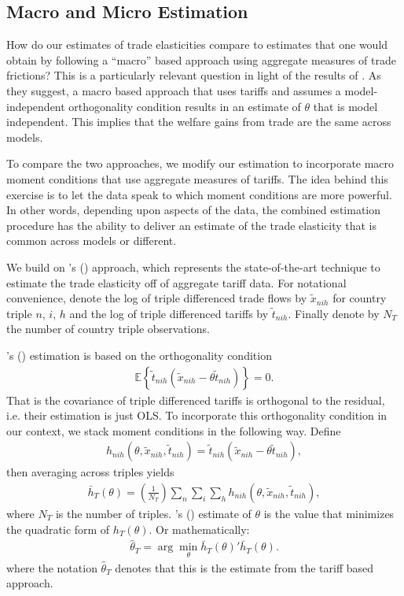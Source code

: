 \documentclass[12pt,dvips, ps2pdf]{article}
\def\citeapos#1{\citeauthor{#1}'s (\citeyear{#1})}
\begin{document}
\subsection{Macro and Micro Estimation}\label{sec:macro_micro}

How do our estimates of trade elasticities compare to estimates that one would obtain by following a ``macro'' based approach using aggregate measures of trade frictions? This is a particularly relevant question in light of the results of \citet{acr09}. As they suggest, a macro based approach that uses tariffs and assumes a model-independent orthogonality condition results in an estimate of $\theta$ that is model independent. This implies that the welfare gains from trade are the same across models.

To compare the two approaches, we modify our estimation to incorporate macro moment conditions that use aggregate measures of tariffs. The idea behind this exercise is to let the data speak to which moment conditions are more powerful. In other words, depending upon aspects of the data, the combined estimation procedure has the ability to deliver an estimate of the trade elasticity that is common across models or different.

We build on \citeapos{caliendo2010} approach, which represents the state-of-the-art technique to estimate the trade elasticity off of aggregate tariff data. For notational convenience, denote the log of triple differenced trade flows by $\tilde x_{nih}$ for country triple $n$, $i$, $h$ and the log of triple differenced tariffs by $\tilde t_{nih}$. Finally denote by $N_T$ the number of country triple observations.

\citeapos{caliendo2010} estimation is based on the orthogonality condition
\begin{align}
\mathbb{E}\left\{ \tilde t_{nih} \left(\tilde x_{nih} - \theta \tilde t_{nih}\right) \right\} = 0.
\end{align}
That is the covariance of triple differenced tariffs is orthogonal to the residual, i.e. their estimation is just OLS. To incorporate this orthogonality condition in our context, we stack moment conditions in the following way. Define
\begin{align}
h_{nih}(\theta,\tilde x_{nih},\tilde t_{nih}) = \tilde t_{nih} \left(\tilde x_{nih} - \theta \tilde t_{nih}\right),
\end{align}
then averaging across triples yields
\begin{align}
\bar{h}_T(\theta) = \left(\frac{1}{N_T}\right)\sum_{n}\sum_{i}\sum_{h}h_{nih}(\theta,\tilde x_{nih},\tilde t_{nih}),
\end{align}
where $N_T$ is the number of triples. \citeapos{caliendo2010} estimate of $\theta$ is the value that minimizes the quadratic form of $h_T(\theta)$. Or mathematically:
\begin{align}
\hat \theta_T = \arg\min_{\theta} \bar{h}_T(\theta)'\bar{h}_T(\theta).
\label{eq:cp_est}
\end{align}
where the notation $\hat \theta_T$ denotes that this is the estimate from the tariff based approach.
\end{document}
